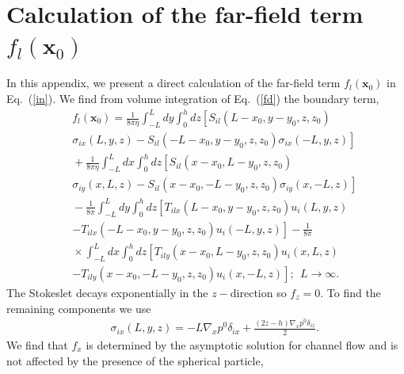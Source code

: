 \appendix

\section{Calculation of the far-field term $f_l(\bm x_0)$}\label{f}

In this appendix, we present a direct calculation of the far-field term $f_l(\bm x_0)$ in Eq.~(\ref{in}). We find from volume integration of Eq.~(\ref{fd}) the boundary term,
\begin{eqnarray}&&\!\!\!
f_l(\bm x_0)=\frac{1}{8\pi\eta} \int_{-L}^L dy\int_0^h dz \left[S_{il}(L-x_0, y-y_0, z, z_0)\right.\nonumber\\&&\!\!\!\left.\sigma_{ix}(L, y, z)-S_{il}(-L-x_0, y-y_0, z, z_0)\sigma_{ix}(-L, y, z)\right]\nonumber\\&&\!\!\!+\frac{1}{8\pi\eta} \int_{-L}^L dx\int_0^h dz \left[S_{il}(x-x_0, L-y_0, z, z_0)\right.\nonumber\\&&\!\!\!\left.\sigma_{iy}(x, L, z)-S_{il}(x-x_0, -L-y_0, z, z_0)\sigma_{iy}(x, -L, z)\right]\nonumber\\&&\!\!\!-\frac{1}{8\pi} \int_{-L}^L dy\int_0^h dz \left[T_{ilx}(L-x_0, y-y_0, z, z_0)u_{i}(L, y, z)\right.\nonumber\\&&\!\!\!\left.-T_{ilx}(-L-x_0, y-y_0, z, z_0)u_{i}(-L, y, z)\right]-\frac{1}{8\pi}\nonumber\\&&\!\!\! \times\int_{-L}^L dx\int_0^h dz \left[T_{ily}(x-x_0, L-y_0, z, z_0)u_{i}(x, L, z)\right.\nonumber\\&&\!\!\!\left.-T_{ily}(x-x_0, -L-y_0, z, z_0)u_{i}(x, -L, z)\right];\ \ L\to\infty.\nonumber
\end{eqnarray}
The Stokeslet decays exponentially in the $z-$direction so $f_z=0$. To find the remaining components we use
\begin{eqnarray}&&\!\!\!\!\!\!\!\!\!\!
\sigma_{ix}(L, y, z)=-L\nabla_x p^0\delta_{ix}+\frac{(2z-h)\nabla_x p^0\delta_{iz} }{2}.
\end{eqnarray}
We find that $f_x$ is determined by the asymptotic solution for channel flow and is not affected by the presence of the spherical particle,
